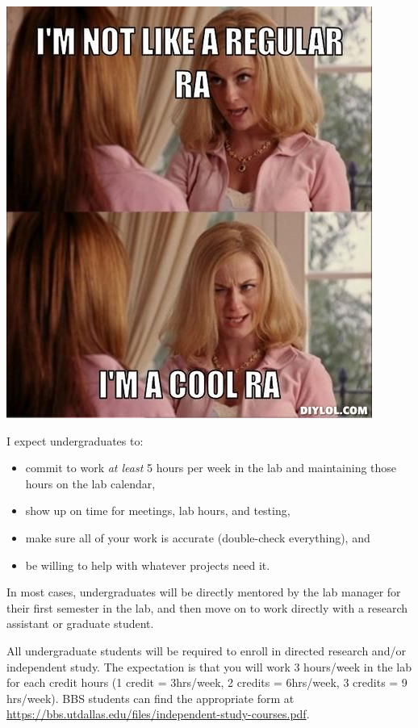 \documentclass[]{book}
\providecommand{\tightlist}{%
  \setlength{\itemsep}{0pt}\setlength{\parskip}{0pt}}
\begin{document}
\includegraphics{images/RAmeme.jpg}

I expect undergraduates to:

\begin{itemize}
\tightlist
\item
  commit to work \emph{at least} 5 hours per week in the lab and maintaining those hours on the lab calendar,
\item
  show up on time for meetings, lab hours, and testing,\\
\item
  make sure all of your work is accurate (double-check everything), and
\item
  be willing to help with whatever projects need it.
\end{itemize}

In most cases, undergraduates will be directly mentored by the lab manager for their first semester in the lab, and then move on to work directly with a research assistant or graduate student.

All undergraduate students will be required to enroll in directed research and/or independent study. The expectation is that you will work 3 hours/week in the lab for each credit hours (1 credit = 3hrs/week, 2 credits = 6hrs/week, 3 credits = 9 hrs/week). BBS students can find the appropriate form at \url{https://bbs.utdallas.edu/files/independent-study-courses.pdf}.
\end{document}
